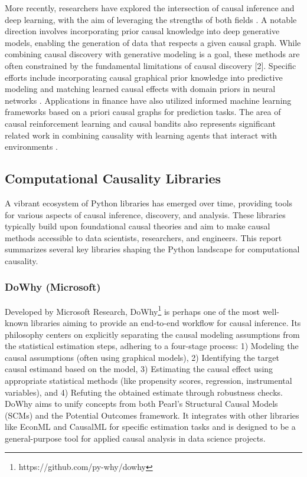 More recently, researchers have explored the intersection of causal inference and deep learning, with the aim of leveraging the strengths of both fields \cite{Scholkopf2021Toward}. A notable direction involves incorporating prior causal knowledge into deep generative models, enabling the generation of data that respects a given causal graph. While combining causal discovery with generative modeling is a goal, these methods are often constrained by the fundamental limitations of causal discovery \cite{Glymour2019Review} [2]. Specific efforts include incorporating causal graphical prior knowledge into predictive modeling \cite{Teshima2021Incorporating} and matching learned causal effects with domain priors in neural networks \cite{Kancheti2022Matching}. Applications in finance have also utilized informed machine learning frameworks based on a priori causal graphs for prediction tasks. The area of causal reinforcement learning and causal bandits also represents significant related work in combining causality with learning agents that interact with environments \cite{Lattimore2016Causal, Lee2018Structural, Zhang2022Causal, Bilodeau2022Adaptively, Lu2020Regret, Tennenholtz2021Bandits}.

\newpage


\subsection{Computational Causality Libraries}

A vibrant ecosystem of Python libraries has emerged over time, providing tools for various aspects of causal inference, discovery, and analysis. These libraries typically build upon foundational causal theories and aim to make causal methods accessible to data scientists, researchers, and engineers. This report summarizes several key libraries shaping the Python landscape for computational causality.

\subsubsection{DoWhy (Microsoft)}

Developed by Microsoft Research, DoWhy\footnote{https://github.com/py-why/dowhy} \cite{sharma2020dowhy} is perhaps one of the most well-known libraries aiming to provide an end-to-end workflow for causal inference. Its philosophy centers on explicitly separating the causal modeling assumptions from the statistical estimation steps, adhering to a four-stage process: 1) Modeling the causal assumptions (often using graphical models), 2) Identifying the target causal estimand based on the model, 3) Estimating the causal effect using appropriate statistical methods (like propensity scores, regression, instrumental variables), and 4) Refuting the obtained estimate through robustness checks. DoWhy aims to unify concepts from both Pearl's Structural Causal Models (SCMs) and the Potential Outcomes framework. It integrates with other libraries like EconML and CausalML for specific estimation tasks and is designed to be a general-purpose tool for applied causal analysis in data science projects.



